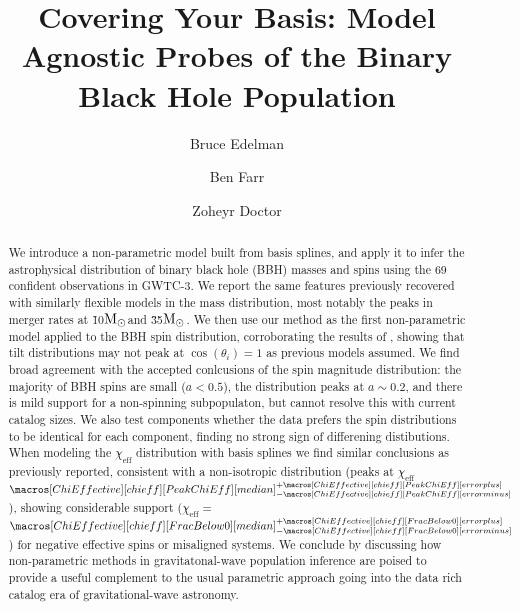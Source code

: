 \documentclass[twocolumn, linenumber]{aastex63}
\newcommand{\msun}{\ensuremath{{\rm M}_\odot}}
\newcommand{\result}[1]{\textcolor{red}{#1}}
\newcommand{\CIPlusMinus}[1]{{#1[median]^{+#1[error plus]}_{-#1[error minus]}}}
\begin{document}
\title{Covering Your Basis: Model Agnostic Probes of the Binary Black Hole Population}

\author{Bruce Edelman}

\author{Ben Farr}

\author{Zoheyr Doctor}




\begin{abstract}                 
We introduce a non-parametric model built from basis splines, and apply it to infer the astrophysical distribution of 
binary black hole (BBH) masses and spins using the 69 confident observations in GWTC-3. We report the same features previously recovered 
with similarly flexible models in the mass distribution, most notably the peaks in merger rates at \~10\msun and \~35\msun. 
We then use our method as the first non-parametric model applied to the BBH spin distribution, corroborating the results of \citet{spinitasyoulike}, 
showing that tilt distributions may not peak at $\cos(\theta_i) = 1$ as previous models assumed. We find broad agreement with the 
accepted conlcusions of the spin magnitude distribution: the majority of BBH spins are small ($a<0.5$), the distribution peaks at $a\sim0.2$, 
and there is mild support for a non-spinning subpopulaton, but cannot resolve this with current catalog sizes. We also test components whether the data 
prefers the spin distributions to be identical for each component, finding no strong sign of differening distibutions. When modeling the $\chi_\mathrm{eff}$ 
distribution with basis splines we find similar conclusions as previously reported, consistent with a non-isotropic distribution 
(peaks at $\chi_\mathrm{eff}$\result{$\CIPlusMinus{\macros[ChiEffective][chieff][PeakChiEff]}$}), showing considerable support 
($\chi_\mathrm{eff}=$\result{$\CIPlusMinus{\macros[ChiEffective][chieff][FracBelow0]}$}) for negative effective spins or misaligned systems.
We conclude by discussing how non-parametric methods in gravitatonal-wave population inference are poised to provide a useful complement to 
the usual parametric approach going into the data rich catalog era of gravitational-wave astronomy.
\end{abstract}
\end{document}
